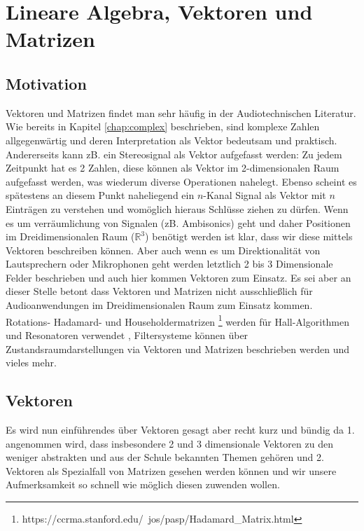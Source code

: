 \chapter{Lineare Algebra, Vektoren und Matrizen}

\citep{strang2020linear}

\section{Motivation}
Vektoren und Matrizen findet man sehr häufig in der Audiotechnischen Literatur. Wie bereits in Kapitel \ref{chap:complex} beschrieben, sind komplexe Zahlen allgegenwärtig und deren Interpretation als Vektor bedeutsam und praktisch. Andererseits kann zB. ein Stereosignal als Vektor aufgefasst werden: Zu jedem Zeitpunkt hat es 2 Zahlen, diese können als Vektor im 2-dimensionalen Raum aufgefasst werden, was wiederum diverse Operationen nahelegt. Ebenso scheint es spätestens an diesem Punkt naheliegend ein $n$-Kanal Signal als Vektor mit $n$ Einträgen zu verstehen und womöglich hieraus Schlüsse ziehen zu dürfen. Wenn es um verräumlichung von Signalen (zB. Ambisonics) geht und daher Positionen im Dreidimensionalen Raum ($\mathbb{R}^3$) benötigt werden ist klar, dass wir diese mittels Vektoren beschreiben können. Aber auch wenn es um Direktionalität von Lautsprechern oder Mikrophonen geht werden letztlich 2 bis 3 Dimensionale Felder beschrieben und auch hier kommen Vektoren zum Einsatz. Es sei aber an dieser Stelle betont dass Vektoren und Matrizen nicht ausschließlich für Audioanwendungen im Dreidimensionalen Raum zum Einsatz kommen. Rotations- Hadamard- und Householdermatrizen \citep{PASPWEB2010}\footnote{https://ccrma.stanford.edu/~jos/pasp/Hadamard\_Matrix.html} werden für Hall-Algorithmen und Resonatoren verwendet , Filtersysteme können über Zustandsraumdarstellungen via Vektoren und Matrizen beschrieben werden \citep{bilbao2009numerical} und vieles mehr.       

\section{Vektoren}
Es wird nun einführendes über Vektoren gesagt aber recht kurz und bündig da 1. angenommen wird, dass insbesondere 2 und 3 dimensionale Vektoren zu den weniger abstrakten und aus der Schule bekannten Themen gehören und 2. Vektoren als Spezialfall von Matrizen gesehen werden können und wir unsere Aufmerksamkeit so schnell wie möglich diesen zuwenden wollen.

